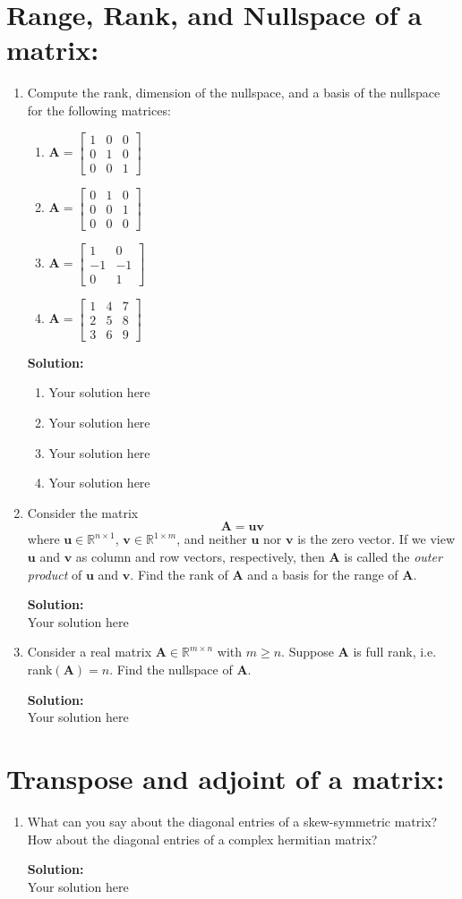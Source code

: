 \documentclass[]{article}
\newcommand{\R}{\mathbb{R}}				%
\newcommand{\bbm}{\begin{bmatrix}}		%
\newcommand{\ebm}{\end{bmatrix}}		%
\newcommand{\A}{\bm{A}}					%
\newcommand{\solution}{\vskip 0.5cm \textbf{\large Solution:} \\}
\begin{document}
\section*{Range, Rank, and Nullspace of a matrix:}
\begin{enumerate}[resume]
	\item Compute the rank, dimension of the nullspace, and a basis of the nullspace for the following matrices:
	\begin{enumerate}
		\item $\A = \bbm 1&0&0\\0&1&0\\0&0&1 \ebm$
		\item $\A = \bbm 0&1&0\\0&0&1\\0&0&0 \ebm$
		\item $\A = \bbm 1&0\\-1&-1\\0&1 \ebm$
		\item $\A = \bbm 1&4&7\\2&5&8\\3&6&9 \ebm$
	\end{enumerate}

	\solution
	\begin{enumerate}
		\item Your solution here
		\item Your solution here
		\item Your solution here
		\item Your solution here
	\end{enumerate}

	\item Consider the matrix
	\[
		\A = \bm{uv}
	\]
	where $\bm{u}\in\R^{n\times 1}$, $\bm{v}\in\R^{1\times m}$, and neither $\bm{u}$ nor $\bm{v}$ is the zero vector. If we view $\bm{u}$ and $\bm{v}$ as column and row vectors, respectively, then $\A$ is called the \textit{outer product} of $\bm{u}$ and $\bm{v}$. Find the rank of $\A$ and a basis for the range of $\A$.

	\solution
	Your solution here


	\item Consider a real matrix $\A\in\R^{m\times n}$ with $m\geq n$. Suppose $\A$ is full rank, i.e. rank$(\A)=n$. Find the nullspace of $\A$.

	\solution
	Your solution here


\end{enumerate}

\section*{Transpose and adjoint of a matrix:}
\begin{enumerate}[resume]
	\item What can you say about the diagonal entries of a skew-symmetric matrix? How about the diagonal entries of a complex hermitian matrix?

	\solution
	Your solution here

\end{enumerate}
\end{document}
